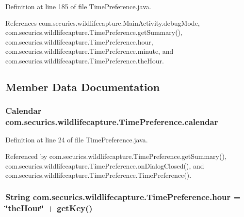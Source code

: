 Definition at line 185 of file Time\+Preference.\+java.



References com.\+securics.\+wildlifecapture.\+Main\+Activity.\+debug\+Mode, com.\+securics.\+wildlifecapture.\+Time\+Preference.\+get\+Summary(), com.\+securics.\+wildlifecapture.\+Time\+Preference.\+hour, com.\+securics.\+wildlifecapture.\+Time\+Preference.\+minute, and com.\+securics.\+wildlifecapture.\+Time\+Preference.\+the\+Hour.



\subsection{Member Data Documentation}
\subsubsection[{calendar}]{\setlength{\rightskip}{0pt plus 5cm}Calendar com.\+securics.\+wildlifecapture.\+Time\+Preference.\+calendar\hspace{0.3cm}{\ttfamily [private]}}\label{classcom_1_1securics_1_1wildlifecapture_1_1_time_preference_ae5cf2fa4244972e3b5579973eea52c1d}


Definition at line 24 of file Time\+Preference.\+java.



Referenced by com.\+securics.\+wildlifecapture.\+Time\+Preference.\+get\+Summary(), com.\+securics.\+wildlifecapture.\+Time\+Preference.\+on\+Dialog\+Closed(), and com.\+securics.\+wildlifecapture.\+Time\+Preference.\+Time\+Preference().

\subsubsection[{hour}]{\setlength{\rightskip}{0pt plus 5cm}String com.\+securics.\+wildlifecapture.\+Time\+Preference.\+hour = \char`\"{}the\+Hour\char`\"{} + get\+Key()\hspace{0.3cm}{\ttfamily [private]}}\label{classcom_1_1securics_1_1wildlifecapture_1_1_time_preference_a27ca8afcc9788451f6d945664dcb76f4}


